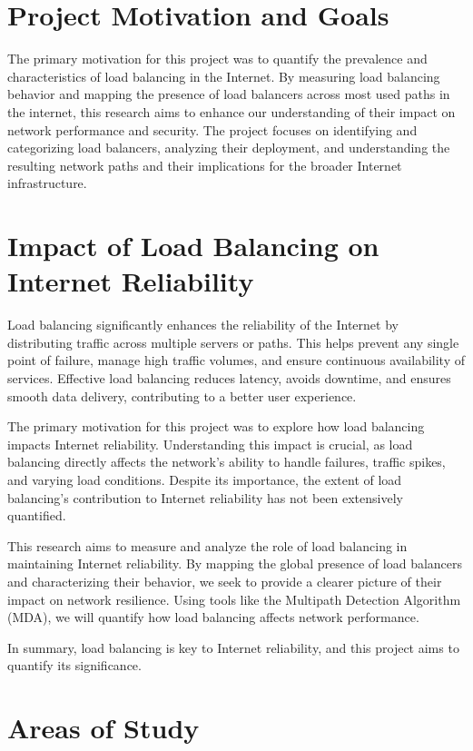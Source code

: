 \documentclass[12pt]{cwru_thesis}
\begin{document}
\section{Project Motivation and Goals}

The primary motivation for this project was to quantify the prevalence and characteristics of load balancing in the Internet. By measuring load balancing behavior and mapping the presence of load balancers across most used paths in the internet, this research aims to enhance our understanding of their impact on network performance and security. The project focuses on identifying and categorizing load balancers, analyzing their deployment, and understanding the resulting network paths and their implications for the broader Internet infrastructure.


\section{Impact of Load Balancing on Internet Reliability}

Load balancing significantly enhances the reliability of the Internet by distributing traffic across multiple servers or paths. This helps prevent any single point of failure, manage high traffic volumes, and ensure continuous availability of services. Effective load balancing reduces latency, avoids downtime, and ensures smooth data delivery, contributing to a better user experience.

The primary motivation for this project was to explore how load balancing impacts Internet reliability. Understanding this impact is crucial, as load balancing directly affects the network's ability to handle failures, traffic spikes, and varying load conditions. Despite its importance, the extent of load balancing's contribution to Internet reliability has not been extensively quantified.

This research aims to measure and analyze the role of load balancing in maintaining Internet reliability. By mapping the global presence of load balancers and characterizing their behavior, we seek to provide a clearer picture of their impact on network resilience. Using tools like the Multipath Detection Algorithm (MDA), we will quantify how load balancing affects network performance.

In summary, load balancing is key to Internet reliability, and this project aims to quantify its significance. 


\section{Areas of Study} \label{sec:Areassection}
\end{document}
